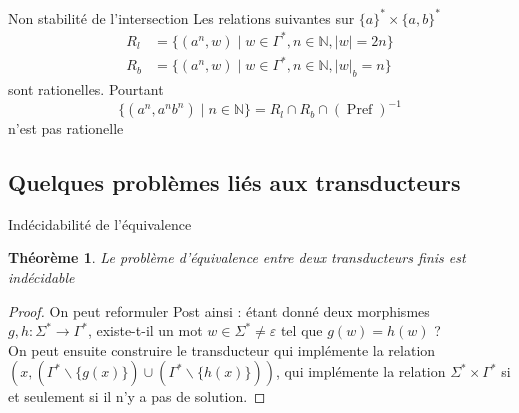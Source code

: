 \documentclass{beamer}
\newtheorem{thm}{Théorème}
\begin{document}
\begin{frame}{Non stabilité de l'intersection}
    Les relations suivantes sur $\{a\}^* \times \{a, b\}^*$
    \begin{equation*}
        \begin{split}
            R_{l} &= \{ (a^n, w) \mid w \in \Gamma^*, n \in \mathbb{N}, |w| = 2n \}\\
            R_{b} &= \{ (a^n, w) \mid w \in \Gamma^*, n \in \mathbb{N}, |w|_b = n \} 
        \end{split}
    \end{equation*}
    sont rationelles. Pourtant
    \[ \{ (a^n, a^nb^n) \mid n \in \mathbb{N} \} = R_l \cap R_b \cap (\operatorname*{Pref})^{-1}\]
    n'est pas rationelle
\end{frame}

\subsection{Quelques problèmes liés aux transducteurs}

\begin{frame}{Indécidabilité de l'équivalence}
    \begin{thm}
        Le problème d'équivalence entre deux transducteurs finis est indécidable
    \end{thm}
    \begin{proof}
        On peut reformuler Post ainsi : étant donné deux morphismes $g, h: \Sigma^* \rightarrow \Gamma^*$, existe-t-il
        un mot $w \in \Sigma^* \neq \varepsilon$ tel que $g(w)=h(w)$ ?\\
        On peut ensuite construire le transducteur qui implémente la relation $(x, (\Gamma^*\backslash \{g(x)\})\cup 
        (\Gamma^* \backslash \{h(x)\}))$, qui implémente la relation $\Sigma^*\times \Gamma^*$ si et seulement si il n'y
        a pas de solution.
        
    \end{proof}
\end{frame}
\end{document}
